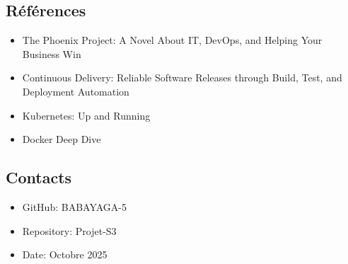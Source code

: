 \documentclass[12pt,a4paper]{article}
\begin{document}
\subsection{Références}

\begin{itemize}
    \item The Phoenix Project: A Novel About IT, DevOps, and Helping Your Business Win
    \item Continuous Delivery: Reliable Software Releases through Build, Test, and Deployment Automation
    \item Kubernetes: Up and Running
    \item Docker Deep Dive
\end{itemize}

\subsection{Contacts}

\begin{itemize}
    \item GitHub: BABAYAGA-5
    \item Repository: Projet-S3
    \item Date: Octobre 2025
\end{itemize}
\end{document}
